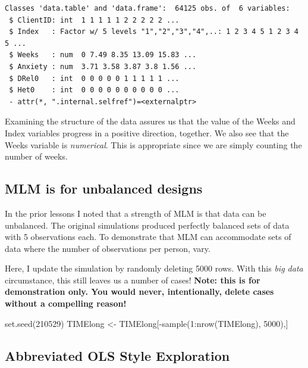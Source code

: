 \documentclass[
  11pt,
]{book}
\newenvironment{Shaded}{\begin{snugshade}}{\end{snugshade}}
\newcommand{\DecValTok}[1]{\textcolor[rgb]{0.00,0.00,0.81}{#1}}
\newcommand{\FunctionTok}[1]{\textcolor[rgb]{0.00,0.00,0.00}{#1}}
\newcommand{\NormalTok}[1]{#1}
\newcommand{\OtherTok}[1]{\textcolor[rgb]{0.56,0.35,0.01}{#1}}
\newcommand{\SpecialCharTok}[1]{\textcolor[rgb]{0.00,0.00,0.00}{#1}}
\begin{document}
\begin{verbatim}
Classes 'data.table' and 'data.frame':  64125 obs. of  6 variables:
 $ ClientID: int  1 1 1 1 1 2 2 2 2 2 ...
 $ Index   : Factor w/ 5 levels "1","2","3","4",..: 1 2 3 4 5 1 2 3 4 5 ...
 $ Weeks   : num  0 7.49 8.35 13.09 15.83 ...
 $ Anxiety : num  3.71 3.58 3.87 3.8 1.56 ...
 $ DRel0   : int  0 0 0 0 0 1 1 1 1 1 ...
 $ Het0    : int  0 0 0 0 0 0 0 0 0 0 ...
 - attr(*, ".internal.selfref")=<externalptr> 
\end{verbatim}

Examining the structure of the data assures us that the value of the Weeks and Index variables progress in a positive direction, together. We also see that the Weeks variable is \emph{numerical}. This is appropriate since we are simply counting the number of weeks.

\hypertarget{mlm-is-for-unbalanced-designs}{%
\subsection{MLM is for unbalanced designs}\label{mlm-is-for-unbalanced-designs}}

In the prior lessons I noted that a strength of MLM is that data can be unbalanced. The original simulations produced perfectly balanced sets of data with 5 observations each. To demonstrate that MLM can accommodate sets of data where the number of observations per person, vary.

Here, I update the simulation by randomly deleting 5000 rows. With this \emph{big data} circumstance, this still leaves us a number of cases! \textbf{Note: this is for demonstration only. You would never, intentionally, delete cases without a compelling reason!}

\begin{Shaded}
\begin{Highlighting}[]
\FunctionTok{set.seed}\NormalTok{(}\DecValTok{210529}\NormalTok{)}
\NormalTok{TIMElong }\OtherTok{\textless{}{-}}\NormalTok{ TIMElong[}\SpecialCharTok{{-}}\FunctionTok{sample}\NormalTok{(}\DecValTok{1}\SpecialCharTok{:}\FunctionTok{nrow}\NormalTok{(TIMElong), }\DecValTok{5000}\NormalTok{),]}
\end{Highlighting}
\end{Shaded}

\hypertarget{abbreviated-ols-style-exploration}{%
\subsection{Abbreviated OLS Style Exploration}\label{abbreviated-ols-style-exploration}}
\end{document}
